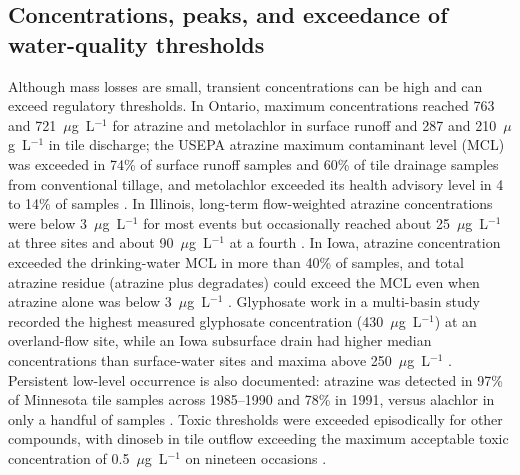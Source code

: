 \documentclass[11pt]{article}
\begin{document}
\subsection{Concentrations, peaks, and exceedance of water-quality thresholds}
Although mass losses are small, transient concentrations can be high and can exceed regulatory thresholds. In Ontario, maximum concentrations reached 763 and 721~$\mu$g~L$^{-1}$ for atrazine and metolachlor in surface runoff and 287 and 210~$\mu$g~L$^{-1}$ in tile discharge; the USEPA atrazine maximum contaminant level (MCL) was exceeded in 74\% of surface runoff samples and 60\% of tile drainage samples from conventional tillage, and metolachlor exceeded its health advisory level in 4 to 14\% of samples \parencite{GAYNOR1995}. In Illinois, long-term flow-weighted atrazine concentrations were below 3~$\mu$g~L$^{-1}$ for most events but occasionally reached about 25~$\mu$g~L$^{-1}$ at three sites and about 90~$\mu$g~L$^{-1}$ at a fourth \parencite{Kalita2006}. In Iowa, atrazine concentration exceeded the drinking-water MCL in more than 40\% of samples, and total atrazine residue (atrazine plus degradates) could exceed the MCL even when atrazine alone was below 3~$\mu$g~L$^{-1}$ \parencite{JAYACHANDRAN1994}. Glyphosate work in a multi-basin study recorded the highest measured glyphosate concentration (430~$\mu$g~L$^{-1}$) at an overland-flow site, while an Iowa subsurface drain had higher median concentrations than surface-water sites and maxima above 250~$\mu$g~L$^{-1}$ \parencite{Coupe2012}. Persistent low-level occurrence is also documented: atrazine was detected in 97\% of Minnesota tile samples across 1985--1990 and 78\% in 1991, versus alachlor in only a handful of samples \parencite{BUHLER1993}. Toxic thresholds were exceeded episodically for other compounds, with dinoseb in tile outflow exceeding the maximum acceptable toxic concentration of 0.5~$\mu$g~L$^{-1}$ on nineteen occasions \parencite{ONEILL1989}.
\end{document}
